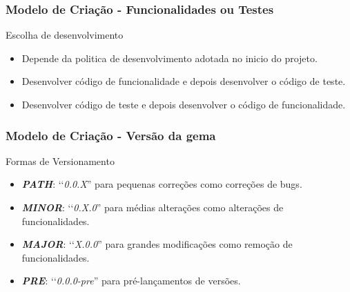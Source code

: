 \begin{frame}
\frametitle{Modelo de Criação -  Funcionalidades ou Testes}

  \begin{block}{Escolha de desenvolvimento}

   \begin{itemize}

    \item Depende da politica de desenvolvimento adotada no inicio do projeto.

    \item Desenvolver código de funcionalidade e depois desenvolver o código de teste.

    \item Desenvolver código de teste e depois desenvolver o código de funcionalidade.

   \end{itemize}

  \end{block}

\end{frame}


\begin{frame}
\frametitle{Modelo de Criação - Versão da gema}

  \begin{block}{Formas de Versionamento}

   \begin{itemize}

    \item \emph{\textbf{PATH}}: ‘‘\emph{0.0.X}'' para pequenas correções como correções de bugs.

    \item \emph{\textbf{MINOR}}: ‘‘\emph{0.X.0}'' para médias alterações como alterações de funcionalidades.

    \item \emph{\textbf{MAJOR}}: ‘‘\emph{X.0.0}'' para grandes modificações como remoção de funcionalidades.

    \item \emph{\textbf{PRE}}: ‘‘\emph{0.0.0-pre}'' para pré-lançamentos de versões.

   \end{itemize}

  \end{block}

\end{frame}


